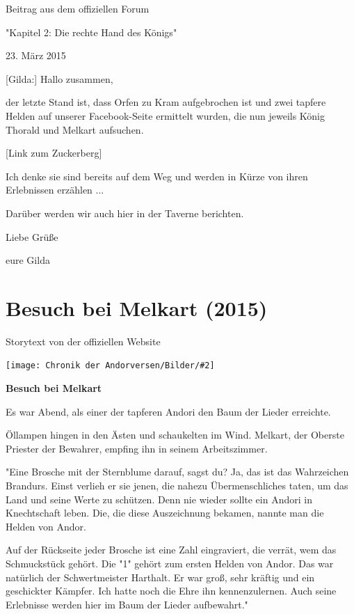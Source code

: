 \documentclass[10pt, a4paper, oneside]{book}
\newcommand{\fillbreak}{\vspace*{\fill}\columnbreak}
\newcommand{\storytext}[1]{%
    \section{#1}%
    \label{Storytext: #1}%
}
\newcommand{\bildmitts}[2][height=0.32\textwidth,width=0.48\textwidth,keepaspectratio]{%
    \begin{center}
        \texttt{[image: Chronik der Andorversen/Bilder/\#2]}
    \end{center}
}
\begin{document}
\begin{multicols}{2}
\begin{center}
    Beitrag aus dem offiziellen Forum

    "Kapitel 2: Die rechte Hand des Königs"

    23. März 2015
\end{center}

[Gilda:] Hallo zusammen,

der letzte Stand ist, dass Orfen zu Kram aufgebrochen ist und zwei tapfere Helden auf unserer Facebook-Seite ermittelt wurden, die nun jeweils König Thorald und Melkart aufsuchen.

[Link zum Zuckerberg]

Ich denke sie sind bereits auf dem Weg und werden in Kürze von ihren Erlebnissen erzählen ...

Darüber werden wir auch hier in der Taverne berichten.

Liebe Grüße

eure Gilda





\fillbreak
\storytext{Besuch bei Melkart (2015)}

\begin{center}
    Storytext von der offiziellen Website
\end{center}

\bildmitts{Besuch bei Melkart Bild 1.jpg}

\textbf{Besuch bei Melkart}\bigskip

Es war Abend, als einer der tapferen Andori den Baum der Lieder erreichte.\bigskip

Öllampen hingen in den Ästen und schaukelten im Wind. Melkart, der Oberste Priester der Bewahrer, empfing ihn in seinem Arbeitszimmer.\bigskip

"Eine Brosche mit der Sternblume darauf, sagst du? Ja, das ist das Wahrzeichen Brandurs. Einst verlieh er sie jenen, die nahezu Übermenschliches taten, um das Land und seine Werte zu schützen. Denn nie wieder sollte ein Andori in Knechtschaft leben. Die, die diese Auszeichnung bekamen, nannte man die Helden von Andor.\bigskip

Auf der Rückseite jeder Brosche ist eine Zahl eingraviert, die verrät, wem das Schmuckstück gehört. Die "1" gehört zum ersten Helden von Andor. Das war natürlich der Schwertmeister Harthalt. Er war groß, sehr kräftig und ein geschickter Kämpfer. Ich hatte noch die Ehre ihn kennenzulernen. Auch seine Erlebnisse werden hier im Baum der Lieder aufbewahrt."\bigskip


\end{multicols}
\end{document}
